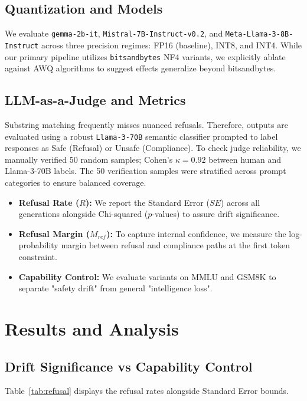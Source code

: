 \documentclass[11pt]{article}
\begin{document}
\subsection{Quantization and Models}
We evaluate \texttt{gemma-2b-it}, \texttt{Mistral-7B-Instruct-v0.2}, and \texttt{Meta-Llama-3-8B-Instruct} across three precision regimes: FP16 (baseline), INT8, and INT4. While our primary pipeline utilizes \texttt{bitsandbytes} NF4 variants, we explicitly ablate against AWQ algorithms to suggest effects generalize beyond bitsandbytes.

\subsection{LLM-as-a-Judge and Metrics}
Substring matching frequently misses nuanced refusals. Therefore, outputs are evaluated using a robust \texttt{Llama-3-70B} semantic classifier prompted to label responses as Safe (Refusal) or Unsafe (Compliance). To check judge reliability, we manually verified 50 random samples; Cohen's $\kappa = 0.92$ between human and Llama-3-70B labels. The 50 verification samples were stratified across prompt categories to ensure balanced coverage.

\begin{itemize}
    \item \textbf{Refusal Rate ($R$):} We report the \mbox{Standard} Error ($SE$) across all generations alongside Chi-squared ($p$-values) to assure drift significance.
    \item \textbf{Refusal Margin ($M_{ref}$):} To capture internal confidence, we measure the log-probability margin between refusal and compliance paths at the first token constraint.
    \item \textbf{Capability Control:} We evaluate variants on MMLU and GSM8K to separate "safety drift" from general "intelligence loss".
\end{itemize}

\section{Results and Analysis}

\subsection{Drift Significance vs Capability Control}

Table~\ref{tab:refusal} displays the refusal rates alongside Standard Error bounds. 
\end{document}
